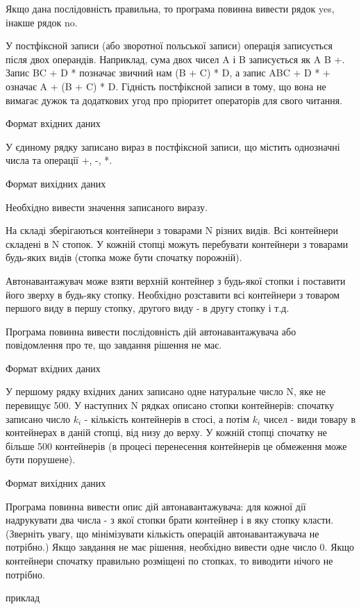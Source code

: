 \documentclass[]{article}
\begin{document}
Якщо дана послідовність правильна, то програма повинна вивести рядок yes, інакше рядок no.


У постфіксной записи (або зворотної польської записи) операція записується після двох операндів. Наприклад, сума двох чисел A і B записується як A B +. Запис BC + D * позначає звичний нам (B + C) * D, а запис ABC + D * + означає A + (B + C) * D. Гідність постфіксной записи в тому, що вона не вимагає дужок та додаткових угод про пріоритет операторів для свого читання.

Формат вхідних даних

У єдиному рядку записано вираз в постфіксной записи, що містить однозначні числа та операції +, -, *.

Формат вихідних даних

Необхідно вивести значення записаного виразу.


На складі зберігаються контейнери з товарами N різних видів. Всі контейнери складені в N стопок. У кожній стопці можуть перебувати контейнери з товарами будь-яких видів (стопка може бути спочатку порожній).

Автонавантажувач може взяти верхній контейнер з будь-якої стопки і поставити його зверху в будь-яку стопку. Необхідно розставити всі контейнери з товаром першого виду в першу стопку, другого виду - в другу стопку і т.д.

Програма повинна вивести послідовність дій автонавантажувача або повідомлення про те, що завдання рішення не має.

Формат вхідних даних

У першому рядку вхідних даних записано одне натуральне число N, яке не перевищує 500. У наступних N рядках описано стопки контейнерів: спочатку записано число $k_i$ - кількість контейнерів в стосі, а потім $k_i$ чисел - види товару в контейнерах в даній стопці, від низу до верху. У кожній стопці спочатку не більше 500 контейнерів (в процесі перенесення контейнерів це обмеження може бути порушене).

Формат вихідних даних

Програма повинна вивести опис дій автонавантажувача: для кожної дії надрукувати два числа - з якої стопки брати контейнер і в яку стопку класти. (Зверніть увагу, що мінімізувати кількість операцій автонавантажувача не потрібно.) Якщо завдання не має рішення, необхідно вивести одне число 0. Якщо контейнери спочатку правильно розміщені по стопках, то виводити нічого не потрібно.

приклад
\end{document}
